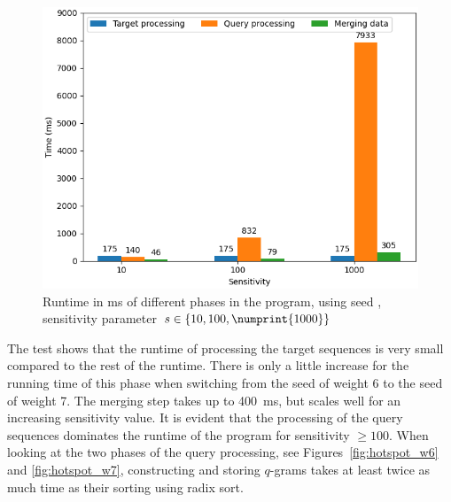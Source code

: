 \documentclass[twoside,a4paper,bsc]{master}
\begin{document}
\begin{figure}
\centering
\includegraphics[scale=0.6]{graphics/program_w7.png}
\caption{Runtime in ms of different phases in the program,
using seed , sensitivity parameter \(s\in\{10,100,\numprint{1000}\}\)}
\label{fig:program_w7}
\end{figure}

The test shows that the runtime of processing the target sequences is very small
compared to the rest of the runtime. There is only a little increase for the
running time of this phase when switching from the seed 
of weight 6 to the seed  of weight 7.
The merging step takes up to 400~ms, but scales well for an increasing
sensitivity value. It is evident that the processing of the query sequences
dominates the runtime of the program for sensitivity \(\geq 100\).
When looking at the two phases of the query processing,
see Figures~\ref{fig:hotspot_w6} and \ref{fig:hotspot_w7}, constructing and
storing \(q\)-grams takes at least twice as much time
as their sorting using radix sort.
\end{document}
